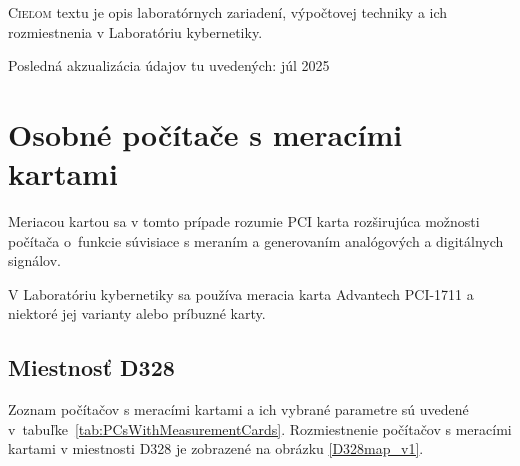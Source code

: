 \documentclass[a4paper, 10pt, ]{article}
\begin{document}
\bigskip

\normalsize
\normalfont

\lstset{style=mystyle}










\noindent
\lettrine[lines=1, nindent=1pt, loversize=0.0]{C}{ieľom} 
textu je opis laboratórnych zariadení, výpočtovej techniky a ich rozmiestnenia v Laboratóriu kybernetiky.

\medskip

\noindent
Posledná akzualizácia údajov tu uvedených: júl 2025


\section{Osobné počítače s meracími kartami}

Meriacou kartou sa v tomto prípade rozumie PCI karta rozširujúca možnosti počítača o~funkcie súvisiace s meraním a generovaním analógových a digitálnych signálov.

V Laboratóriu kybernetiky sa používa meracia karta Advantech PCI-1711 a niektoré jej varianty alebo príbuzné karty.



\subsection{Miestnosť D328}

Zoznam počítačov s meracími kartami a ich vybrané parametre sú uvedené v~tabuľke~\ref{tab:PCsWithMeasurementCards}. Rozmiestnenie počítačov s meracími kartami v miestnosti D328 je zobrazené na obrázku \ref{D328map_v1}.
\end{document}
